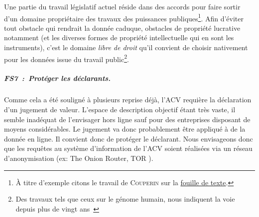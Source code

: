Une partie du travail législatif actuel réside dans des accords pour faire sortir d'un domaine propriétaire des travaux des puissances publiques\footnote{À titre d'exemple citons le travail de \textsc{Couperin} sur la \href{https://www.republique-numerique.fr/consultations/projet-de-loi-numerique/consultation/consultation/opinions/section-2-travaux-de-recherche-et-de-statistique/exception-de-fouille-de-texte-et-de-donnees}{fouille de texte}.}.
Afin d'éviter tout obstacle qui rendrait la donnée caduque, obstacles de propriété lucrative notamment (et les diverses formes de propriété intellectuelle qui en sont les instruments), c'est le domaine \emph{libre de droit} qu'il convient de choisir nativement pour les données issue du travail public\footnote{Des travaux tels que ceux sur le génome humain, nous indiquent la voie depuis plus de vingt ans~\cite{pietu_projet_2013}}.
\subparagraph{FS7~:~Protéger les déclarants.}
Comme cela a été souligné à plusieurs reprise déjà, l'\gls{ACV} requière la déclaration d'un jugement de valeur.
L'espace de description objectif étant très vaste, il semble inadéquat de l'envisager hors ligne sauf pour des entreprises disposant de moyens considérables.
Le jugement va donc probablement être appliqué à de la donnée en ligne.
Il convient donc de protéger le déclarant.
Nous envisageons donc que les requêtes au système d'information de l'\gls{ACV} soient réalisées via un réseau d'anonymisation (ex: The Onion Router, TOR \cite{dingledine_tor:_2004,reed_anonymous_1998}).

